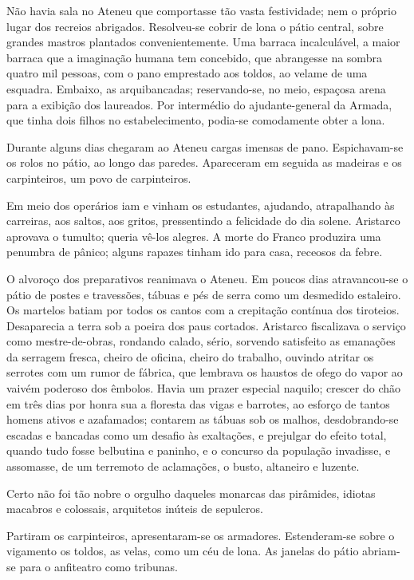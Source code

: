 Não havia sala no Ateneu que comportasse tão
vasta festividade; nem o próprio lugar dos recreios abrigados.
Resolveu{}-se cobrir de lona o pátio central, sobre grandes mastros
plantados convenientemente. Uma barraca incalculável, a maior barraca
que a imaginação humana tem concebido, que abrangesse na sombra quatro
mil pessoas, com o pano emprestado aos toldos, ao velame de uma
esquadra. Embaixo, as arquibancadas; reservando{}-se, no meio, espaçosa
arena para a exibição dos laureados. Por intermédio do
ajudante{}-general da Armada, que tinha dois filhos no estabelecimento,
podia{}-se comodamente obter a lona. 

Durante alguns dias chegaram ao
Ateneu cargas imensas de pano. Espichavam{}-se os rolos no pátio,
ao longo das paredes. Apareceram em seguida as madeiras e os
carpinteiros, um povo de carpinteiros. 

Em meio dos operários iam e
vinham os estudantes, ajudando, atrapalhando às carreiras, aos saltos,
aos gritos, pressentindo a felicidade do dia solene. Aristarco aprovava
o tumulto; queria vê{}-los alegres. A morte do Franco produzira uma
penumbra de pânico; alguns rapazes tinham ido para casa, receosos da
febre. 

O alvoroço dos preparativos reanimava o Ateneu. Em poucos dias
atravancou{}-se o pátio de postes e travessões, tábuas e pés de serra
como um desmedido estaleiro. Os martelos batiam por todos os cantos com
a crepitação contínua dos tiroteios. Desaparecia a terra sob a poeira
dos paus cortados. Aristarco fiscalizava o serviço como
mestre{}-de{}-obras, rondando calado, sério, sorvendo satisfeito as
emanações da serragem fresca, cheiro de oficina, cheiro do trabalho,
ouvindo atritar os serrotes com um rumor de fábrica, que lembrava os
haustos de ofego do vapor ao vaivém poderoso dos êmbolos. Havia um
prazer especial naquilo; crescer do chão em três dias por honra sua a
floresta das vigas e barrotes, ao esforço de tantos homens ativos e
azafamados; contarem as tábuas sob os malhos, desdobrando{}-se escadas
e bancadas como um desafio às exaltações, e prejulgar do efeito total,
quando tudo fosse belbutina e paninho, e o concurso da população
invadisse, e assomasse, de um terremoto de aclamações, o busto,
altaneiro e luzente. 

Certo não foi tão nobre o orgulho daqueles
monarcas das pirâmides, idiotas macabros e colossais, arquitetos
inúteis de sepulcros. 

Partiram os carpinteiros, apresentaram{}-se os
armadores. Estenderam{}-se sobre o vigamento os toldos, as velas, como
um céu de lona. As janelas do pátio abriam{}-se para o anfiteatro como
tribunas. 

